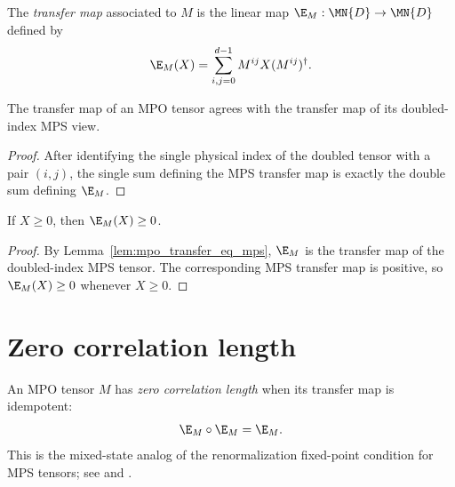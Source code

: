 \begin{definition}\label{def:mpo_transfer_map}
    \leanok
    The \emph{transfer map} associated to $M$ is the linear map
    $\E_M : \MN{D} \to \MN{D}$ defined by
    \[
        \E_M(X) = \sum_{i,j=0}^{d-1} M^{ij} X (M^{ij})^\dagger.
    \]
\end{definition}

\begin{lemma}\label{lem:mpo_transfer_eq_mps}
    \leanok
    The transfer map of an MPO tensor agrees with the transfer map of its
    doubled-index MPS view.
\end{lemma}

\begin{proof}
    \leanok
    After identifying the single physical index of the doubled tensor with a
    pair $(i,j)$, the single sum defining the MPS transfer map is exactly the
    double sum defining $\E_M$.
\end{proof}

\begin{theorem}\label{thm:mpo_transfer_pos}
    \leanok
    If $X \ge 0$, then $\E_M(X) \ge 0$.
\end{theorem}

\begin{proof}
    \leanok
    By Lemma~\ref{lem:mpo_transfer_eq_mps}, $\E_M$ is the transfer map of the
    doubled-index MPS tensor. The corresponding MPS transfer map is positive,
    so $\E_M(X) \ge 0$ whenever $X \ge 0$.
\end{proof}

\section{Zero correlation length}

\begin{definition}%
    \label{def:mpo_is_zcl}
    \leanok
    An MPO tensor $M$ has \emph{zero correlation length} when its transfer map
    is idempotent:
    \[
        \E_M \circ \E_M = \E_M.
    \]
    This is the mixed-state analog of the renormalization fixed-point
    condition for MPS tensors; see \cite[definition of MPDO zero correlation
        length, lines~736--741]{Cirac2016MPDO_arXiv} and
    \cite[Section~II.E.2, lines~937--939]{Cirac2021Matrix}.
\end{definition}

